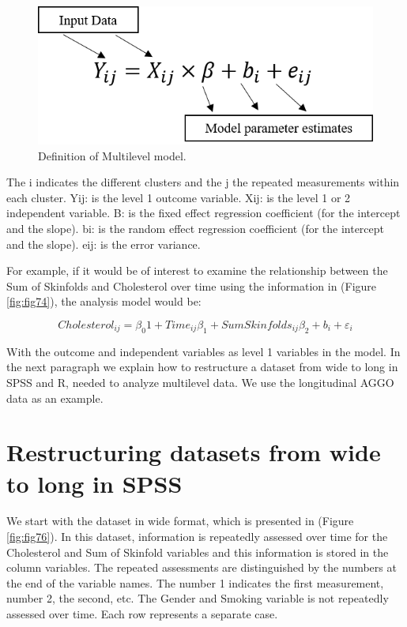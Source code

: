 \documentclass[]{book}
\theoremstyle{definition}
\theoremstyle{definition}
\theoremstyle{definition}
\theoremstyle{remark}
\begin{document}
\begin{figure}

{\centering \includegraphics[width=0.4\linewidth]{images/fig7.5} 

}

\caption{Definition of Multilevel model.}\label{fig:fig75}
\end{figure}

The i indicates the different clusters and the j the repeated
measurements within each cluster. Yij: is the level 1 outcome variable.
Xij: is the level 1 or 2 independent variable. B: is the fixed effect
regression coefficient (for the intercept and the slope). bi: is the
random effect regression coefficient (for the intercept and the slope).
eij: is the error variance.

For example, if it would be of interest to examine the relationship
between the Sum of Skinfolds and Cholesterol over time using the
information in (Figure \ref{fig:fig74}), the analysis model would be:

\[Cholesterol_{ij} = \beta_0 1 + Time_{ij}\beta_1 + SumSkinfolds_{ij}\beta_2 + b_i + \varepsilon_i\]

With the outcome and independent variables as level 1 variables in the
model. In the next paragraph we explain how to restructure a dataset
from wide to long in SPSS and R, needed to analyze multilevel data. We
use the longitudinal AGGO data as an example.

\section{Restructuring datasets from wide to long in
SPSS}\label{restructuring-datasets-from-wide-to-long-in-spss}

We start with the dataset in wide format, which is presented in (Figure
\ref{fig:fig76}). In this dataset, information is repeatedly assessed
over time for the Cholesterol and Sum of Skinfold variables and this
information is stored in the column variables. The repeated assessments
are distinguished by the numbers at the end of the variable names. The
number 1 indicates the first measurement, number 2, the second, etc. The
Gender and Smoking variable is not repeatedly assessed over time. Each
row represents a separate case.
\end{document}
